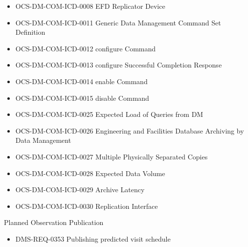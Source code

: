 \begin{itemize}
\item OCS-DM-COM-ICD-0008 EFD Replicator Device
\item OCS-DM-COM-ICD-0011 Generic Data Management Command Set Definition
\item OCS-DM-COM-ICD-0012 configure Command
\item OCS-DM-COM-ICD-0013 configure Successful Completion Response
\item OCS-DM-COM-ICD-0014 enable Command
\item OCS-DM-COM-ICD-0015 disable Command
\item OCS-DM-COM-ICD-0025 Expected Load of Queries from DM
\item OCS-DM-COM-ICD-0026 Engineering and Facilities Database Archiving by Data Management
\item OCS-DM-COM-ICD-0027 Multiple Physically Separated Copies
\item OCS-DM-COM-ICD-0028 Expected Data Volume
\item OCS-DM-COM-ICD-0029 Archive Latency
\item OCS-DM-COM-ICD-0030 Replication Interface
\end{itemize}
Planned Observation Publication \begin{itemize}
\item DMS-REQ-0353 Publishing predicted visit schedule
\end{itemize}
